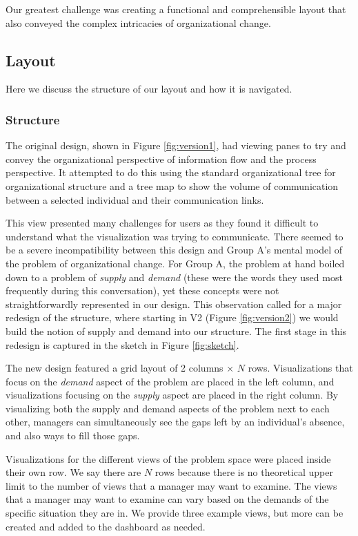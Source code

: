 \documentclass[journal]{vgtc}                %
\begin{document}
Our greatest challenge was creating a functional and comprehensible layout that also conveyed the complex intricacies of organizational change.

\subsection{Layout}
Here we discuss the structure of our layout and how it is navigated. 
\subsubsection{Structure}
The original design, shown in Figure \ref{fig:version1}, had  viewing panes to try and convey the organizational perspective of information flow and the process perspective.  It attempted to do this using the standard organizational tree for organizational structure and a tree map to show the volume of communication between a selected individual and their communication links.

This view presented many challenges for users as they found it difficult to understand what the visualization was trying to communicate. There seemed to be a severe incompatibility between this design and Group A's mental model of the problem of organizational change. For Group A, the problem at hand boiled down to a problem of \emph{supply} and \emph{demand} (these were the words they used most frequently during this conversation), yet these concepts were not straightforwardly represented in our design. This observation called for a major redesign of the structure, where starting in V2 (Figure \ref{fig:version2}) we would build the notion of supply and demand into our structure. The first stage in this redesign is captured in the sketch in Figure \ref{fig:sketch}.

The new design featured a grid layout of 2 columns $\times $ $N$ rows. Visualizations that focus on the \emph{demand} aspect of the problem are placed in the left column, and visualizations focusing on the \emph{supply} aspect are placed in the right column. By visualizing both the supply and demand aspects of the problem next to each other, managers can simultaneously see the gaps left by an individual's absence, and also ways to fill those gaps.

Visualizations for the different views of the problem space were placed inside their own row. We say there are $N$ rows because there is no theoretical upper limit to the number of views that a manager may want to examine. The views that a manager may want to examine can vary based on the demands of the specific situation they are in. We provide three example views, but more can be created and added to the dashboard as needed.
\end{document}
